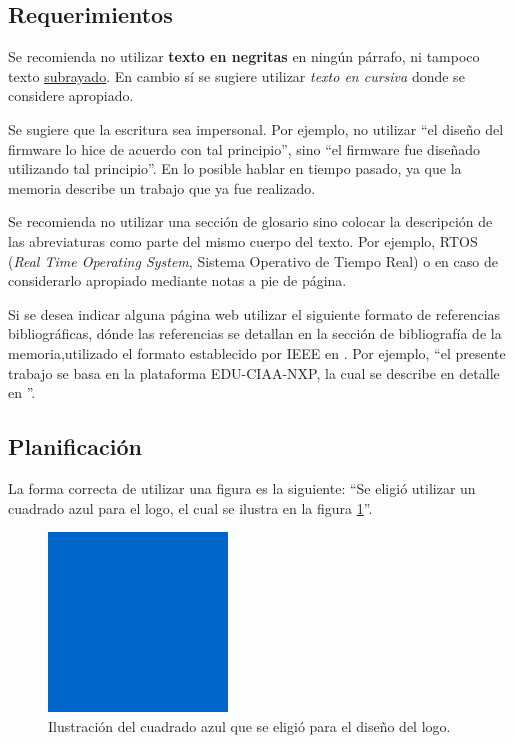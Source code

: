 \subsection{Requerimientos}
\label{subsec:ejemplo}

Se recomienda no utilizar \textbf{texto en negritas} en ningún párrafo, ni tampoco texto \underline{subrayado}. En cambio sí se sugiere utilizar \textit{texto en cursiva} donde se considere apropiado.

Se sugiere que la escritura sea impersonal. Por ejemplo, no utilizar ``el diseño del firmware lo hice de acuerdo con tal principio'', sino ``el firmware fue diseñado utilizando tal principio''. En lo posible hablar en tiempo pasado, ya que la memoria describe un trabajo que ya fue realizado.

Se recomienda no utilizar una sección de glosario sino colocar la descripción de las abreviaturas como parte del mismo cuerpo del texto. Por ejemplo, RTOS (\textit{Real Time Operating System}, Sistema Operativo de Tiempo Real) o en caso de considerarlo apropiado mediante notas a pie de página.

Si se desea indicar alguna página web utilizar el siguiente formato de referencias bibliográficas, dónde las referencias se detallan en la sección de bibliografía de la memoria,utilizado el formato establecido por IEEE en \citep{IEEE:citation}. Por ejemplo, ``el presente trabajo se basa en la plataforma EDU-CIAA-NXP, la cual se describe en detalle en \citep{CIAA}''.

\subsection{Planificación} 

La forma correcta de utilizar una figura es la siguiente: ``Se eligió utilizar un cuadrado azul para el logo, el cual se ilustra en la figura \ref{fig:cuadradoAzul}''.

\begin{figure}[h]
	\centering
	\includegraphics[scale=.35]{./Figures/cuadradoAzul.png}
	\caption{Ilustración del cuadrado azul que se eligió para el diseño del logo.}
	\label{fig:cuadradoAzul}
\end{figure}

